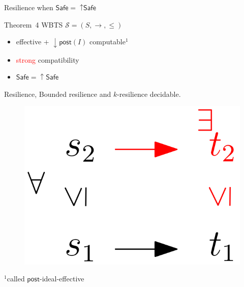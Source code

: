 \documentclass{beamer}
\newcommand{\post}{\textsf{post}}
\newcommand{\Safe}{\textsf{Safe}}
\begin{document}
  \begin{frame}{Resilience when $\Safe = {\uparrow \Safe}$}
   




\begin{block}{Theorem~4}
WBTS $\mathscr{S}=(S,\rightarrow, \leq)$ 
\begin{itemize}
\item effective + $\mathop{\downarrow} \post(I)$ computable$^1$ %
\item \textcolor{red}{strong} compatibility
\item $\Safe = \mathop{\uparrow} \Safe$
\end{itemize}
{\sc Resilience}, {\sc Bounded resilience} 
and {\sc $k$-resilience} decidable.
\end{block}


\begin{center}
 	\begin{figure}
\includegraphics[width=.25\textwidth]{WSTS_strong}
	\end{figure}
\end{center}  

\phantom{Footnote}

{\small $^1$called $\post$-ideal-effective }

       \end{frame}
\end{document}
